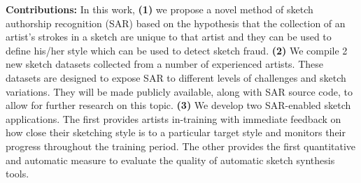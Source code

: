 \vspace{-1mm}
\textbf{Contributions:} In this work, \textbf{(1)} we propose a novel method of sketch authorship recognition (SAR) based on the hypothesis that the collection of an artist's strokes in a sketch are unique to that artist and they can be used to define his/her style which can be used to detect sketch fraud. \textbf{(2)} We compile 2 new sketch datasets collected from  a number of experienced artists. These datasets are designed to expose SAR to different levels of challenges and sketch variations. They will be made publicly available, along with SAR source code, to allow for further research on this topic. \textbf{(3)} We develop two SAR-enabled sketch applications. The first provides artists in-training with immediate feedback on how close their sketching style is to a particular target style and monitors their progress throughout the training period. The other provides the first quantitative and automatic measure to evaluate the quality of automatic sketch synthesis tools.




